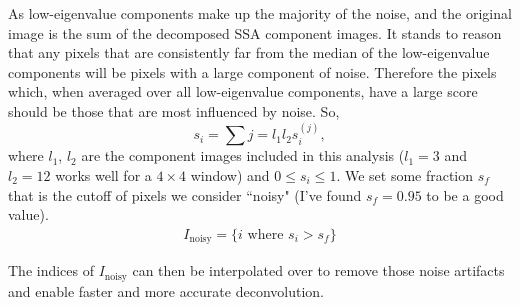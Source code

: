 As low-eigenvalue components make up the majority of the noise, and the original image is the sum of the decomposed SSA component images. It stands to reason that any pixels that are consistently far from the median of the low-eigenvalue components will be pixels with a large component of noise. Therefore the pixels which, when averaged over all low-eigenvalue components, have a large score should be those that are most influenced by noise. So,
\[
	s_i = \sum\limits{j=l_1}{l_2} s_i^{(j)},
\]
where $l_1$, $l_2$ are the component images included in this analysis ($l_1=3$ and $l_2=12$ works well for a $4 \times 4$ window) and $0 \leq s_i \leq 1$. We set some fraction $s_f$ that is the cutoff of pixels we consider ``noisy" (I've found $s_f=0.95$ to be a good value).
\begin{align*}
	I_{\textrm{noisy}} = \lbrace i \textrm{  where  } s_i > s_f \rbrace
\end{align*}

The indices of $I_{\textrm{noisy}}$ can then be interpolated over to remove those noise artifacts and enable faster and more accurate deconvolution.







































